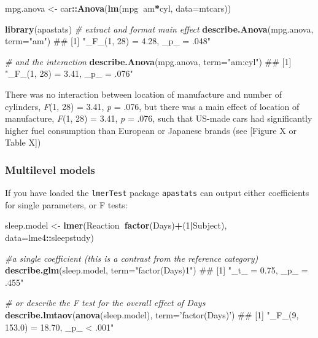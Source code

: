 \documentclass[]{article}
\newenvironment{Shaded}{\begin{snugshade}}{\end{snugshade}}
\newcommand{\KeywordTok}[1]{\textcolor[rgb]{0.13,0.29,0.53}{\textbf{#1}}}
\newcommand{\DataTypeTok}[1]{\textcolor[rgb]{0.13,0.29,0.53}{#1}}
\newcommand{\DecValTok}[1]{\textcolor[rgb]{0.00,0.00,0.81}{#1}}
\newcommand{\StringTok}[1]{\textcolor[rgb]{0.31,0.60,0.02}{#1}}
\newcommand{\CommentTok}[1]{\textcolor[rgb]{0.56,0.35,0.01}{\textit{#1}}}
\newcommand{\OperatorTok}[1]{\textcolor[rgb]{0.81,0.36,0.00}{\textbf{#1}}}
\newcommand{\NormalTok}[1]{#1}
\theoremstyle{definition}
\theoremstyle{definition}
\theoremstyle{definition}
\theoremstyle{remark}
\begin{document}
\begin{Shaded}
\begin{Highlighting}[]
\NormalTok{mpg.anova <-}\StringTok{ }\NormalTok{car}\OperatorTok{::}\KeywordTok{Anova}\NormalTok{(}\KeywordTok{lm}\NormalTok{(mpg}\OperatorTok{~}\NormalTok{am}\OperatorTok{*}\NormalTok{cyl, }\DataTypeTok{data=}\NormalTok{mtcars))}

\KeywordTok{library}\NormalTok{(apastats)}
\CommentTok{# extract and format main effect}
\KeywordTok{describe.Anova}\NormalTok{(mpg.anova, }\DataTypeTok{term=}\StringTok{"am"}\NormalTok{)}
\NormalTok{## [1] "_F_(1, 28) = 4.28, _p_ = .048"}

\CommentTok{# and the interaction}
\KeywordTok{describe.Anova}\NormalTok{(mpg.anova, }\DataTypeTok{term=}\StringTok{"am:cyl"}\NormalTok{)}
\NormalTok{## [1] "_F_(1, 28) = 3.41, _p_ = .076"}
\end{Highlighting}
\end{Shaded}

{There was no interaction between location of manufacture and number of
cylinders, \emph{F}(1, 28) = 3.41, \emph{p} = .076, but there was a main
effect of location of manufacture, \emph{F}(1, 28) = 3.41, \emph{p} =
.076, such that US-made cars had significantly higher fuel consumption
than European or Japanese brands (see {[}Figure X or Table X{]})}

\hypertarget{multilevel-models}{\subsubsection*{Multilevel
models}\label{multilevel-models}}

If you have loaded the \texttt{lmerTest} package \texttt{apastats} can
output either coefficients for single parameters, or F tests:

\begin{Shaded}
\begin{Highlighting}[]
\NormalTok{sleep.model <-}\StringTok{ }\KeywordTok{lmer}\NormalTok{(Reaction}\OperatorTok{~}\KeywordTok{factor}\NormalTok{(Days)}\OperatorTok{+}\NormalTok{(}\DecValTok{1}\OperatorTok{|}\NormalTok{Subject), }\DataTypeTok{data=}\NormalTok{lme4}\OperatorTok{::}\NormalTok{sleepstudy)}

\CommentTok{#a single coefficient (this is a contrast from the reference category)}
\KeywordTok{describe.glm}\NormalTok{(sleep.model, }\DataTypeTok{term=}\StringTok{"factor(Days)1"}\NormalTok{)}
\NormalTok{## [1] "_t_ =  0.75, _p_ = .455"}

\CommentTok{# or describe the F test for the overall effect of Days}
\KeywordTok{describe.lmtaov}\NormalTok{(}\KeywordTok{anova}\NormalTok{(sleep.model), }\DataTypeTok{term=}\StringTok{'factor(Days)'}\NormalTok{)}
\NormalTok{## [1] "_F_(9, 153.0) = 18.70, _p_ < .001"}
\end{Highlighting}
\end{Shaded}
\end{document}
